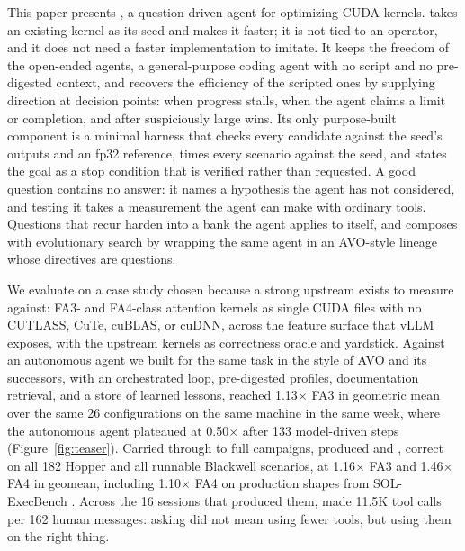 This paper presents \sys, a question-driven agent for optimizing CUDA kernels. \sys takes an
existing kernel as its seed and makes it faster; it is not tied to an operator, and it does not need
a faster implementation to imitate. It keeps the freedom of the open-ended agents, a general-purpose
coding agent with no script and no pre-digested context, and recovers the efficiency of the scripted
ones by supplying direction at decision points: when progress stalls, when the agent claims a limit
or completion, and after suspiciously large wins. Its only purpose-built component is a minimal
harness that checks every candidate against the seed's outputs and an fp32 reference, times every
scenario against the seed, and states the goal as a stop condition that is verified rather than
requested. A good question contains no answer: it names a hypothesis the agent has not considered,
and testing it takes a measurement the agent can make with ordinary tools. Questions that recur
harden into a bank the agent applies to itself, and \sys composes with evolutionary search by
wrapping the same agent in an AVO-style lineage whose directives are questions.

We evaluate \sys on a case study chosen because a strong upstream exists to measure against:
FA3- and FA4-class attention kernels as single CUDA files with no CUTLASS, CuTe, cuBLAS, or cuDNN,
across the feature surface that vLLM exposes, with the upstream kernels as correctness oracle and
yardstick. Against an autonomous agent we built for the same task in the style of AVO and its
successors, with an orchestrated loop, pre-digested profiles, documentation retrieval, and a store
of learned lessons, \sys reached 1.13$\times$ FA3 in geometric mean over the same 26 configurations
on the same machine in the same week, where the autonomous agent plateaued at 0.50$\times$ after 133
model-driven steps (Figure~\ref{fig:teaser}). Carried through to full campaigns, \sys produced
\fathree and \fafour, correct on all 182 Hopper and all runnable Blackwell scenarios, at
1.16$\times$ FA3 and 1.46$\times$ FA4 in geomean, including 1.10$\times$ FA4 on production shapes
from SOL-ExecBench \cite{lin2026solexecbench}. Across the 16 sessions that produced them, \sys
made 11.5K tool calls per 162 human messages: asking did not mean using fewer tools, but using them
on the right thing.

